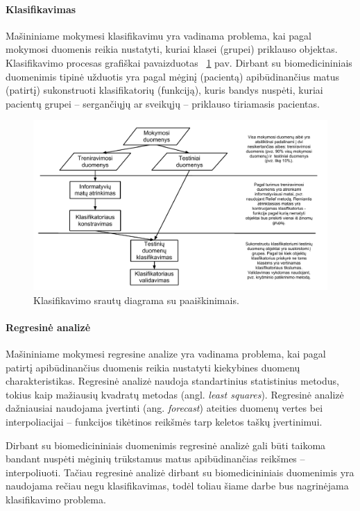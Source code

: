 \paragraph{Klasifikavimas}

Mašininiame mokymesi klasifikavimu yra vadinama problema, kai pagal mokymosi duomenis reikia nustatyti, kuriai klasei (grupei) priklauso objektas. Klasifikavimo procesas grafiškai pavaizduotas ~\ref{fig:classification_process} pav. Dirbant su biomedicininiais duomenimis tipinė užduotis yra pagal mėginį (pacientą) apibūdinančius matus (patirtį) sukonstruoti klasifikatorių (funkciją), kuris bandys nuspėti, kuriai pacientų grupei -- sergančiųjų ar sveikųjų -- priklauso tiriamasis pacientas.
\begin{figure}
 \centering
 \includegraphics[width=\textwidth]{images/classification_process.pdf}
 \caption{Klasifikavimo srautų diagrama su paaiškinimais.}
 \label{fig:classification_process}
\end{figure}

\paragraph{Regresinė analizė}

Mašininiame mokymesi regresine analize yra vadinama problema, kai pagal patirtį apibūdinančius duomenis reikia nustatyti kiekybines duomenų charakteristikas. Regresinė analizė naudoja standartinius statistinius metodus, tokius kaip mažiausių kvadratų metodas (angl. \textit{least squares}). Regresinė analizė dažniausiai naudojama įvertinti (ang. \textit{forecast}) ateities duomenų vertes bei interpoliacijai -- funkcijos tikėtinos reikšmės tarp keletos taškų įvertinimui. 

Dirbant su biomedicininiais duomenimis regresinė analizė gali būti taikoma bandant nuspėti mėginių trūkstamus matus apibūdinančias reikšmes -- interpoliuoti. Tačiau regresinė analizė dirbant su biomedicininiais duomenimis yra naudojama rečiau negu klasifikavimas, todėl toliau šiame darbe bus nagrinėjama klasifikavimo problema.

